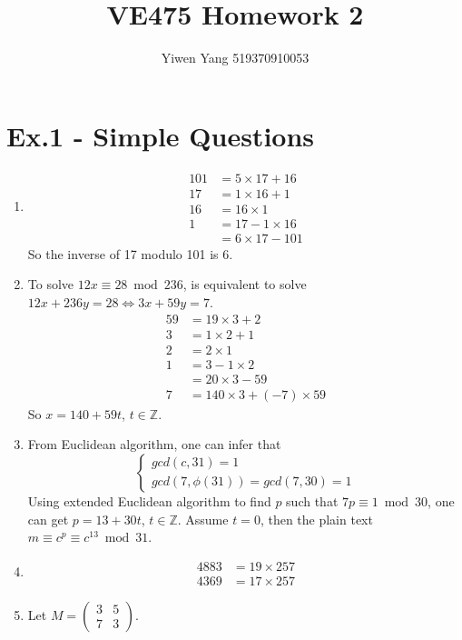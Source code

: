\documentclass[12pt]{article}
\title{VE475 Homework 2}
\author{Yiwen Yang 519370910053}
\begin{document}
\date{}
\maketitle

\section*{Ex.1 - Simple Questions}

\begin{enumerate}
	\item 
	\begin{align*}
		101 &= 5 \times 17 + 16\\
		17 &= 1 \times 16 + 1\\
		16 &= 16 \times 1\\
		1 &= 17 - 1 \times 16\\
		&= 6 \times 17 - 101
	\end{align*}
	So the inverse of 17 modulo 101 is 6.
	\item To solve $12x \equiv 28 \bmod 236$, is equivalent to solve $12x + 236y = 28 \Leftrightarrow 3x + 59y = 7$.
	\begin{align*}
		59 &= 19 \times 3 + 2\\
		3 &= 1 \times 2 + 1\\
		2 &= 2 \times 1\\
		1 &= 3 - 1 \times 2\\
		&= 20 \times 3 - 59\\
		7 &= 140 \times 3 + (-7) \times 59
	\end{align*}
	So $x = 140 + 59t$, $t \in \mathbb{Z}$.
	\item
	From Euclidean algorithm, one can infer that
	\begin{displaymath}
		\left\{
		\begin{array}{l}
			gcd(c, 31) = 1\\
			gcd(7, \phi(31)) = gcd(7, 30) = 1
		\end{array}
		\right.
	\end{displaymath}
	Using extended Euclidean algorithm to find $p$ such that $7p \equiv 1 \bmod 30$, one can get $p = 13 + 30t$, $t \in \mathbb{Z}$. Assume $t = 0$, then the plain text $m \equiv c^p \equiv c^{13} \bmod 31$.
	\item
	\begin{align*}
		4883 &= 19 \times 257\\
		4369 &= 17 \times 257
	\end{align*}
	\item Let 
		$M = 
		\begin{pmatrix}
			3 & 5\\
			7 & 3
		\end{pmatrix}$. 


\end{enumerate}
\end{document}
